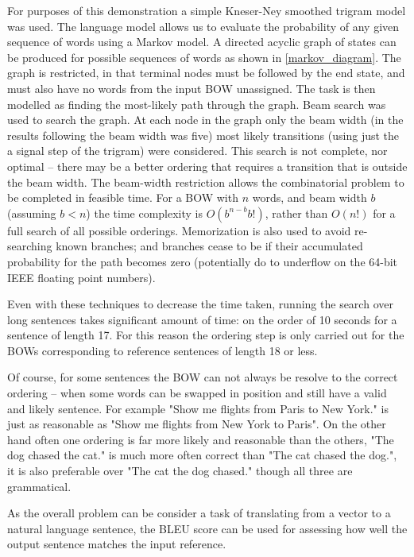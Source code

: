 \documentclass[]{scrartcl}
\numberwithin{equation}{section}
\numberwithin{figure}{section}
\theoremstyle{plain}
\theoremstyle{definition}
\begin{document}
For purposes of this demonstration a simple Kneser-Ney smoothed trigram model \parencite{kneser1995improved} was used. The language model allows us to evaluate the probability of any given sequence of words using a Markov model.
A directed acyclic graph of states can be produced for possible sequences of words as shown in \cref{markov_diagram}. The graph is restricted, in that terminal nodes must be followed by the end state, and must also have no words from the input BOW unassigned. The task is then modelled as finding the most-likely path through the graph.
Beam search was used to search the graph. At each node in the graph only the beam width (in the results following the beam width was five) most likely transitions (using just the a signal step of the trigram) were considered. This search is not complete, nor optimal -- there may be a better ordering that requires a transition that is outside the beam width. The beam-width restriction allows the combinatorial problem to be completed in feasible time. For a BOW with $n$ words, and beam width $b$ (assuming $b<n$) the time complexity is $O(b^{n-b}b!)$, rather than $O(n!)$ for a full search of all possible orderings. Memorization is also used to avoid re-searching known branches; and branches cease to be  if their accumulated probability for the path becomes zero (potentially do to underflow on the 64-bit IEEE floating point numbers).

Even with these techniques to decrease the time taken, running the search over long sentences takes significant amount of time: on the order of 10 seconds for a sentence of length 17. For this reason the ordering step is only carried out for the BOWs corresponding to reference sentences of length 18 or less. 
 
 
Of course, for some sentences the BOW can not always be resolve to the correct ordering -- when some words can be swapped in position and still have a valid and likely sentence. For example "Show me flights from Paris to New York." is just as reasonable as  "Show me flights from New York to Paris". On the other hand often one ordering is far more likely and reasonable than the others, "The dog chased the cat." is much more often correct than "The cat chased the dog.", it is also preferable over "The cat the dog chased." though all three are grammatical. 
  


As the overall problem can be consider a task of translating from a vector to a natural language sentence, the BLEU  score \parencite{Papineni2002} can be used for assessing how well the output sentence matches the input reference.
\end{document}
